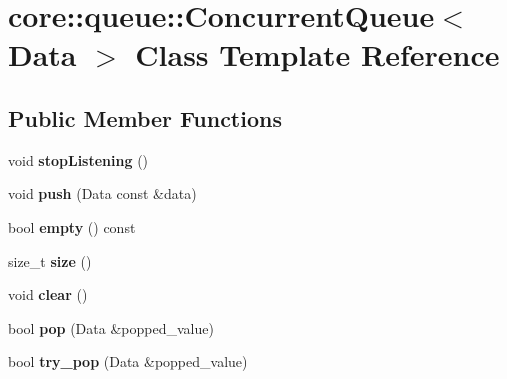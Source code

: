 \hypertarget{classcore_1_1queue_1_1_concurrent_queue}{}\section{core\+:\+:queue\+:\+:Concurrent\+Queue$<$ Data $>$ Class Template Reference}
\label{classcore_1_1queue_1_1_concurrent_queue}
\subsection*{Public Member Functions}
\begin{DoxyCompactItemize}
\item 
\mbox{\label{classcore_1_1queue_1_1_concurrent_queue_a972550162a81c46c7625dc058c25ab2f}} 
void {\bfseries stop\+Listening} ()
\item 
\mbox{\label{classcore_1_1queue_1_1_concurrent_queue_abfda98371a9073994c95288aa2bfd8ef}} 
void {\bfseries push} (Data const \&data)
\item 
\mbox{\label{classcore_1_1queue_1_1_concurrent_queue_a567a6f2dc9943cbac1d2a3d01eab8f56}} 
bool {\bfseries empty} () const
\item 
\mbox{\label{classcore_1_1queue_1_1_concurrent_queue_a431d2cdda3ee09b60757fbc6601e2110}} 
size\+\_\+t {\bfseries size} ()
\item 
\mbox{\label{classcore_1_1queue_1_1_concurrent_queue_a5b351f053e24197cc75d18914976fe32}} 
void {\bfseries clear} ()
\item 
\mbox{\label{classcore_1_1queue_1_1_concurrent_queue_a0b26fbfd4071a1bdb87f71e05ad11b8a}} 
bool {\bfseries pop} (Data \&popped\+\_\+value)
\item 
\mbox{\label{classcore_1_1queue_1_1_concurrent_queue_a85d96ade5c6e6cb79b1e36fe119ef7ba}} 
bool {\bfseries try\+\_\+pop} (Data \&popped\+\_\+value)
\item 

\end{DoxyCompactItemize}
